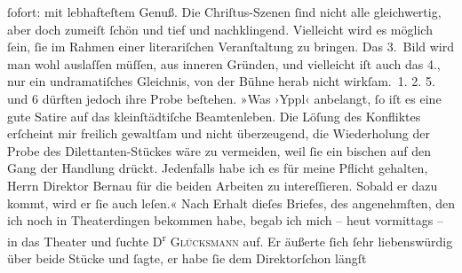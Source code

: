 \begin{ledgroupsized}[t]{13cm}
                    ſofort: mit lebhafteſtem Genuß. Die Chriſtus-Szenen ſind nicht alle gleichwertig, aber doch zumeiſt ſchön und
                    tief und nachklingend. Vielleicht wird es möglich ſein, ſie im Rahmen einer {\pb}literariſchen Veranſtaltung zu
                    bringen. Das 3. Bild wird man wohl auslaſſen müſſen, aus inneren Gründen, und
                    vielleicht iſt auch das 4., nur ein undramatiſches Gleichnis, von der Bühne
                    herab nicht wirkſam. 1.{ }2.{ }5. und 6 dürften jedoch ihre Probe beſtehen.\pend
           \pstart
           »Was ›Yppl‹ anbelangt, ſo iſt es eine gute
                    Satire auf das kleinſtädtiſche Beamtenleben. Die Löſung des Konfliktes erſcheint
                    mir freilich gewaltſam und nicht überzeugend, die Wiederholung der Probe des
                    Dilettanten-Stückes wäre zu vermeiden, weil ſie ein bischen auf den Gang der
                    Handlung drückt. Jedenfalls habe ich es für meine Pflicht gehalten, Herrn
                    Direktor Bernau für die beiden Arbeiten zu
                    intereſſieren. Sobald er dazu kommt, wird er ſie auch leſen.«\pend
           \pstart
           Nach Erhalt dieſes Briefes, des angenehmſten, den ich noch in Theaterdingen
                    bekommen habe, begab ich mich – heut vormittags – in das Theater und ſuchte D\textsuperscript{r}{ }\textsc{Glücksmann} auf. Er äußerte ſich ſehr liebenswürdig {\pb}über beide Stücke und ſagte, er habe ſie dem
                        Direktorſchon längſt

\end{ledgroupsized}
